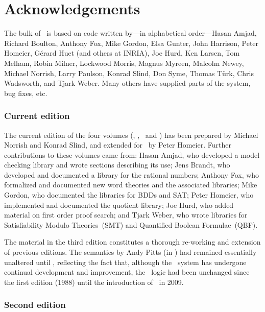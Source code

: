 \chapter*{Acknowledgements}

The bulk of \HOLW\ is based on code written by---in alphabetical
order---Hasan Amjad, Richard Boulton, Anthony Fox, Mike Gordon, Elsa
Gunter, John Harrison, Peter Homeier, G\'erard Huet (and others at
INRIA), Joe Hurd, Ken Larsen, Tom Melham, Robin Milner, Lockwood
Morris, Magnus Myreen, Malcolm Newey, Michael Norrish, Larry Paulson,
Konrad Slind, Don Syme, Thomas T\"urk, Chris Wadsworth, and Tjark
Weber.  Many others have supplied parts of the system, bug fixes, etc.

\subsection*{Current edition}

The current edition of the four volumes (\LOGIC, \TUTORIAL,
\DESCRIPTION\ and \REFERENCE) has been prepared by Michael Norrish and
Konrad Slind, and extended for \HOLW\ 
by Peter Homeier.
Further contributions to these volumes came from: Hasan
Amjad, who developed a model checking library and wrote sections
describing its use; Jens Brandt, who developed and documented a
library for the rational numbers; Anthony Fox, who formalized and
documented new word theories and the associated libraries; Mike
Gordon, who documented the libraries for BDDs and SAT; Peter Homeier,
who implemented and documented the quotient library; Joe Hurd, who
added material on first order proof search; and Tjark Weber, who wrote
libraries for Satisfiability Modulo Theories~(SMT) and Quantified
Boolean Formulae~(QBF).

\medskip

The material in the third edition constitutes a thorough re-working
and extension of previous editions.  The semantics by Andy Pitts (in \LOGIC)
had remained essentially unaltered until \HOLW, reflecting the fact
that, although the \HOL\ system has undergone continual development
and improvement, the \HOL\ logic had been unchanged since the first edition
(1988) until the introduction of \HOLW\ in 2009.

\newpage

\subsection*{Second edition}

